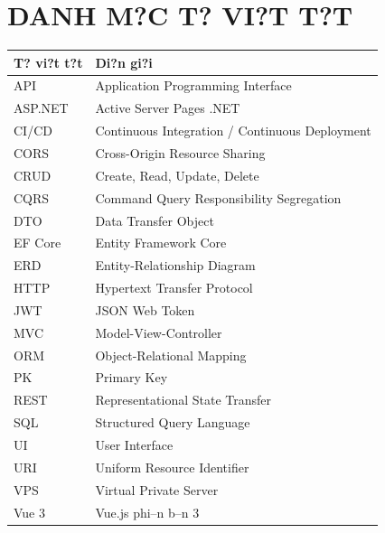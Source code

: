\chapter*{DANH M?C T? VI?T T?T}

\begin{longtable}{|p{3cm}|p{10cm}|}
\hline
\textbf{T? vi?t t?t} & \textbf{Di?n gi?i} \\
\hline
API & Application Programming Interface \\
\hline
ASP.NET & Active Server Pages .NET \\
\hline
CI/CD & Continuous Integration / Continuous Deployment \\
\hline
CORS & Cross-Origin Resource Sharing \\
\hline
CRUD & Create, Read, Update, Delete \\
\hline
CQRS & Command Query Responsibility Segregation \\
\hline
DTO & Data Transfer Object \\
\hline
EF Core & Entity Framework Core \\
\hline
ERD & Entity-Relationship Diagram \\
\hline
HTTP & Hypertext Transfer Protocol \\
\hline
JWT & JSON Web Token \\
\hline
MVC & Model-View-Controller \\
\hline
ORM & Object-Relational Mapping \\
\hline
PK & Primary Key \\
\hline
REST & Representational State Transfer \\
\hline
SQL & Structured Query Language \\
\hline
UI & User Interface \\
\hline
URI & Uniform Resource Identifier \\
\hline
VPS & Virtual Private Server \\
\hline
Vue 3 & Vue.js phi--n b--n 3 \\
\hline
\end{longtable}
